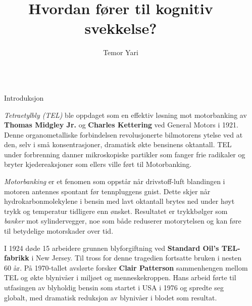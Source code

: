 \documentclass[final]{beamer}
\title{Hvordan fører \text{\textit{Tetraetylbly (\ce{Pb(C_2H_5)_4})}} til kognitiv svekkelse?}
\author{Temor Yari}
\institute[Bjerke Videregående Skole]{Bjerke Videregående Skole}
\newlength{\sepwidth}
\newlength{\colwidth}
\newcommand{\separatorcolumn}{\begin{column}{\sepwidth}\end{column}}
\begin{document}
\begin{frame}[t]
	\vspace{0.4cm}
	\begin{columns}[t]
		\separatorcolumn

		\begin{column}{\colwidth}

			\begin{block}{Introduksjon}

				\textit{Tetraetylbly (TEL)} ble oppdaget som en effektiv løsning mot motorbanking av
				\textbf{Thomas Midgley Jr.} og \textbf{Charles Kettering} ved General Motors i 1921. Denne
				organometalliske forbindelsen revolusjonerte bilmotorens ytelse ved at den, selv i små
				konsentrasjoner, dramatisk økte bensinens oktantall. TEL under forbrenning danner
				mikroskopiske partikler som fanger frie radikaler og bryter kjedereaksjoner som ellers ville
				ført til Motorbanking.

				\textit{Motorbanking} er et fenomen som oppstår når drivstoff-luft blandingen i motoren
				antennes spontant før tennpluggens gnist. Dette skjer når hydrokarbonmolekylene i bensin med
				lavt oktantall brytes ned under høyt trykk og temperatur tidligere enn ønsket. Resultatet er
				trykkbølger som \textit{banker} mot sylindervegger, noe som både reduserer motorytelsen og
				kan føre til betydelige motorskader over tid.

				I 1924 døde 15 arbeidere grunnen blyforgiftning ved \textbf{Standard Oil's TEL-fabrikk} i
				New Jersey. Til tross for denne tragedien fortsatte bruken i nesten 60 år. På 1970-tallet
				avslørte forsker \textbf{Clair Patterson} sammenhengen mellom TEL og økte blynivåer i
				miljøet og menneskekroppen. Hans arbeid førte til utfasingen av blyholdig bensin som startet
				i USA i 1976 og spredte seg globalt, med dramatisk reduksjon av blynivåer i blodet som
				resultat.


\end{block}
\end{column}
\end{columns}
\end{frame}
\end{document}
